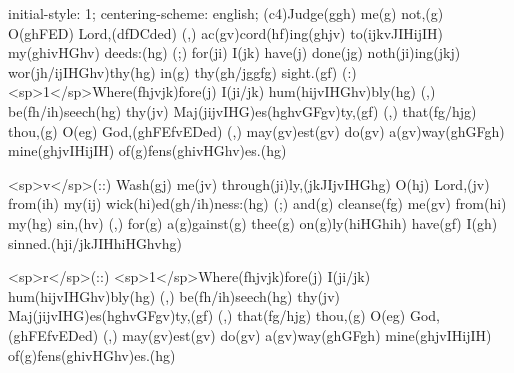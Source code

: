 initial-style: 1;
centering-scheme: english;
(c4)Judge(ggh) me(g) not,(g) O(ghFED) Lord,(dfDCded) (,) ac(gv)cord(hf)ing(ghjv) to(ijkvJIHijIH) my(ghivHGhv) deeds:(hg) (;) for(ji) I(jk) have(j) done(jg) noth(ji)ing(jkj) wor(jh/ijIHGhv)thy(hg) in(g) thy(gh/jggfg) sight.(gf) (:) <sp>1</sp>Where(fhjvjk)fore(j) I(ji/jk) hum(hijvIHGhv)bly(hg) (,) be(fh/ih)seech(hg) thy(jv) Maj(jijvIHG)es(hghvGFgv)ty,(gf) (,) that(fg/hjg) thou,(g) O(eg) God,(ghFEfvEDed) (,) may(gv)est(gv) do(gv) a(gv)way(ghGFgh) mine(ghjvIHijIH) of(g)fens(ghivHGhv)es.(hg)

<sp>v</sp>(::) Wash(gj) me(jv) through(ji)ly,(jkJIjvIHGhg) O(hj) Lord,(jv) from(ih) my(ij) wick(hi)ed(gh/ih)ness:(hg) (;) and(g) cleanse(fg) me(gv) from(hi) my(hg) sin,(hv) (,) for(g) a(g)gainst(g) thee(g) on(g)ly(hiHGhih) have(gf) I(gh) sinned.(hji/jkJIHhiHGhvhg)

<sp>r</sp>(::) <sp>1</sp>Where(fhjvjk)fore(j) I(ji/jk) hum(hijvIHGhv)bly(hg) (,) be(fh/ih)seech(hg) thy(jv) Maj(jijvIHG)es(hghvGFgv)ty,(gf) (,) that(fg/hjg) thou,(g) O(eg) God,(ghFEfvEDed) (,) may(gv)est(gv) do(gv) a(gv)way(ghGFgh) mine(ghjvIHijIH) of(g)fens(ghivHGhv)es.(hg)
